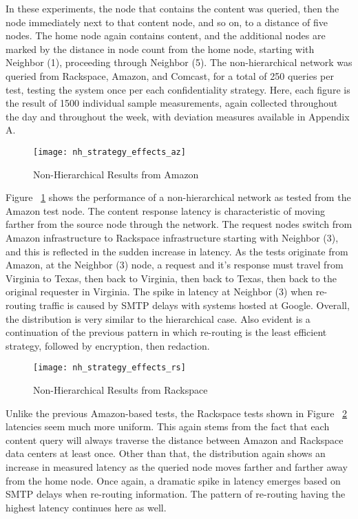 In these experiments, the node that contains the content was queried, then the node immediately next to that content node, and so on, to a distance of five nodes.  The home node again contains content, and the additional nodes are marked by the distance in node count from the home node, starting with Neighbor (1), proceeding through Neighbor (5).  The non-hierarchical network was queried from Rackspace, Amazon, and Comcast, for a total of 250 queries per test, testing the system once per each confidentiality strategy.  Here, each figure is the result of 1500 individual sample measurements, again collected throughout the day and throughout the week, with deviation measures available in Appendix A.

\begin{figure}[!t]
\centering
\texttt{[image: nh\_strategy\_effects\_az]}
\caption{Non-Hierarchical Results from Amazon}
\label{fig:model:nh-amazon-results}
\end{figure}

Figure ~\ref{fig:model:nh-amazon-results} shows the performance of a non-hierarchical network as tested from the Amazon test node.  The content response latency is characteristic of moving farther from the source node through the network.  The request nodes switch from Amazon infrastructure to Rackspace infrastructure starting with Neighbor (3), and this is reflected in the sudden increase in latency.  As the tests originate from Amazon, at the Neighbor (3) node, a request and it's response must travel from Virginia to Texas, then back to Virginia, then back to Texas, then back to the original requester in Virginia.  The spike in latency at Neighbor (3) when re-routing traffic is caused by SMTP delays with systems hosted at Google.  Overall, the distribution is very similar to the hierarchical case.  Also evident is a continuation of the previous pattern in which re-routing is the least efficient strategy, followed by encryption, then redaction.

\begin{figure}[!t]
\centering
\texttt{[image: nh\_strategy\_effects\_rs]}
\caption{Non-Hierarchical  Results from Rackspace}
\label{fig:model:nh-rackspace-results}
\end{figure}

Unlike the previous Amazon-based tests, the Rackspace tests shown in Figure ~\ref{fig:model:nh-rackspace-results} latencies seem much more uniform.  This again stems from the fact that each content query will always traverse the distance between Amazon and Rackspace data centers at least once.  Other than that, the distribution again shows an increase in measured latency as the queried node moves farther and farther away from the home node.  Once again, a dramatic spike in latency emerges based on SMTP delays when re-routing information.  The pattern of re-routing having the highest latency continues here as well.

